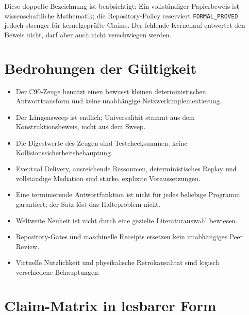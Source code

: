\documentclass[11pt,a4paper]{article}
\theoremstyle{remark}
\begin{document}
Diese doppelte Bezeichnung ist beabsichtigt: Ein vollständiger Papierbeweis
ist wissenschaftliche Mathematik; die Repository-Policy reserviert
\texttt{FORMAL\_PROVED} jedoch strenger für kernelgeprüfte Claims. Der
fehlende Kernellauf entwertet den Beweis nicht, darf aber auch nicht
verschwiegen werden.

\section{Bedrohungen der Gültigkeit}

\begin{itemize}
  \item Der C90-Zeuge benutzt einen bewusst kleinen deterministischen
        Antworttransform und keine unabhängige Netzwerkimplementierung.
  \item Der Längensweep ist endlich; Universalität stammt aus dem
        Konstruktionsbeweis, nicht aus dem Sweep.
  \item Die Digestwerte des Zeugen sind Testchecksummen, keine
        Kollisionssicherheitsbehauptung.
  \item Eventual Delivery, ausreichende Ressourcen, deterministisches Replay
        und vollständige Mediation sind starke, explizite Voraussetzungen.
  \item Eine terminierende Antwortfunktion ist nicht für jedes beliebige
        Programm garantiert; der Satz löst das Halteproblem nicht.
  \item Weltweite Neuheit ist nicht durch eine gezielte Literaturauswahl
        bewiesen.
  \item Repository-Gates und maschinelle Receipts ersetzen kein unabhängiges
        Peer Review.
  \item Virtuelle Nützlichkeit und physikalische Retrokausalität sind
        logisch verschiedene Behauptungen.
\end{itemize}

\section{Claim-Matrix in lesbarer Form}
\end{document}

